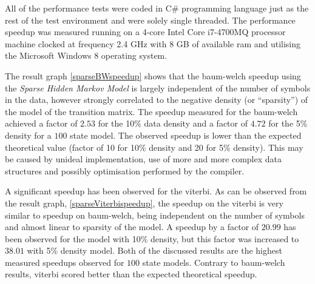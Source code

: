 All of the performance tests were coded in C\# programming language just as the rest of the test environment and were solely single threaded. The performance speedup was measured running on a 4-core Intel Core i7-4700MQ processor machine clocked at frequency 2.4 GHz with 8 GB of available \gls{ram} and utilising the Microsoft Windows 8 operating system.

The result graph \ref{sparseBWspeedup} shows that the \gls{baum-welch} speedup using the \emph{Sparse Hidden Markov Model} is largely independent of the number of symbols in the data, however strongly correlated to the negative density (or ``sparsity'') of the model of the transition matrix. The speedup measured for the \gls{baum-welch} achieved a factor of $2.53$ for the 10\%  data density and a factor of $4.72$ for the 5\% density for a $100$ state model. The observed speedup is lower than the expected theoretical value (factor of 10 for 10\% density and 20 for 5\% density). This may be caused by unideal implementation, use of more and more complex data structures and possibly optimisation performed by the compiler.

A significant speedup has been observed for the \gls{viterbi}. As can be observed from the result graph, \ref{sparseViterbispeedup}, the speedup on the \gls{viterbi} is very similar to speedup on \gls{baum-welch}, being independent on the number of symbols and almost linear to sparsity of the model. A speedup by a factor of $20.99$ has been observed for the model with 10\% density, but this factor was increased to $38.01$ with 5\% density model. Both of the discussed results are the highest measured speedups observed for $100$ state models. Contrary to \gls{baum-welch} results, \gls{viterbi} scored better than the expected theoretical speedup.